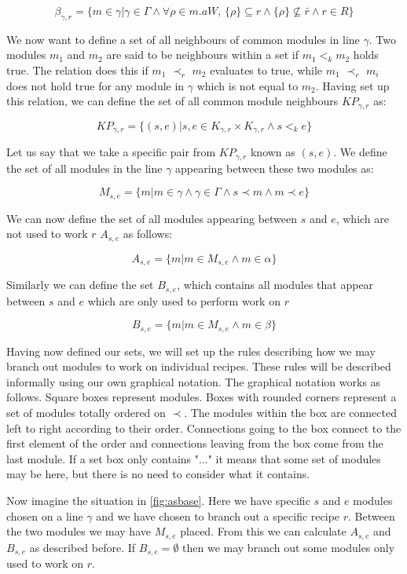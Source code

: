 \[\beta_{\gamma ,r}  = \{m \in \gamma | \gamma \in \Gamma \land \forall \rho \in m.aW,\, \{\rho\} \subseteq r \land \{\rho\} \nsubseteq \bar{r} \land r \in R\}\]

We now want to define a set of all neighbours of common modules in line $\gamma$. Two modules $m_1$ and $m_2$ are said to be neighbours within a set if $m_1 <_k m_2$ holds true. The relation does this if $m_1$ $\prec_r$ $m_2$ evaluates to true, while $m_1$ $\prec_r$ $m_i$ does not hold true for any module in $\gamma$ which is not equal to $m_2$. Having set up this relation, we can define the set of all common module neighbours $KP_{\gamma ,r}$ as:
 
\[KP_{\gamma ,r} = \{(s, e)| {s, e} \in K_{\gamma ,r} \times K_{\gamma ,r} \land s <_k  e\}\]


Let us say that we take a specific pair from $KP_{\gamma ,r}$  known as $(s,e)$. We define the set of all modules in the line $\gamma$ appearing between these two modules as: 

\[M_{s,e} = \{m | m \in \gamma \land \gamma \in \Gamma \land s \prec m \land m \prec e\}\]

We can now define the set of all modules appearing between $s$ and $e$, which are not used to work $r$ $A_{s,e}$ as follows: 

\[A_{s,e} = \{m |m \in M_{s,e} \land m \in \alpha\}\]

Similarly we can define the set $B_{s,e}$, which contains all modules that appear between $s$ and $e$ which are only used to perform work on $r$

\[B_{s,e} = \{m |m \in M_{s,e} \land m \in \beta\}\]

Having now defined our sets, we will set up the rules describing how we may branch out modules to work on individual recipes. These rules will be described informally using our own graphical notation. The graphical notation works as follows. Square boxes represent modules. Boxes with rounded corners represent a set of modules totally ordered on $\prec$. The modules within the box are connected left to right according to their order. Connections going to the box connect to the first element of the order and connections leaving from the box come from the last module. If a set box only contains "..." it means that some set of modules may be here, but there is no need to consider what it contains. 

Now imagine the situation in \cref{fig:asbase}. Here we have specific $s$ and $e$ modules chosen on a line $\gamma$ and we have chosen to branch out a specific recipe $r$. Between the two modules we may have $M_{s,e}$ placed. From this we can calculate $A_{s,e}$ and $B_{s,e}$ as described before. If $B_{s,e} = \emptyset$ then we may branch out some modules only used to work on $r$. 

